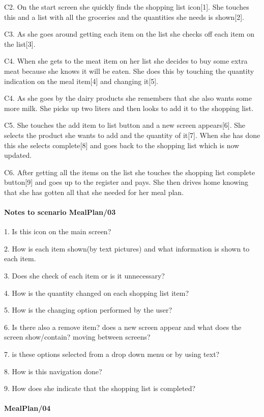 	C2. On the start screen she quickly finds the shopping list icon[1]. She touches this and a list with all the groceries and the quantities she needs is shown[2].
	
	C3. As she goes around getting each item on the list she checks off each item on the list[3].
	
	C4. When she gets to the meat item on her list she decides to buy some extra meat because she knows it will be eaten. She does this by touching the quantity indication on the meal item[4] and changing it[5]. 	
	
	C4. As she goes by the dairy products she remembers that she also wants some more milk. She picks up two liters and then looks to add it to the shopping list.
	
	C5. She touches the add item to list button and a new screen appears[6]. She selects the product she wants to add and the quantity of it[7]. When she has done this she selects complete[8] and goes back to the shopping list which is now updated.
	
	C6. After getting all the items on the list she touches the shopping list complete button[9] and goes up to the register and pays. She then drives home knowing that she has gotten all that she needed for her meal plan.    
	
\paragraph{Notes to scenario MealPlan/03}

1. Is this icon on the main screen?

2. How is each item shown(by text pictures) and what information is shown to each item.

3. Does she check of each item or is it unnecessary?

4. How is the quantity changed on each shopping list item?  

5. How is the changing option performed by the user?

6. Is there also a remove item? does a new screen appear and what does the screen show/contain? moving between screens?

7. is these options selected from a drop down menu or by using text?

8. How is this navigation done?

9. How does she indicate that the shopping list is completed?

\paragraph{MealPlan/04}

